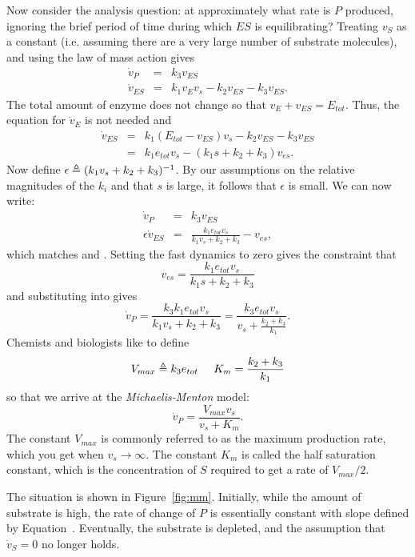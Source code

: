 Now consider the analysis question: at approximately what rate is $P$
produced, ignoring the brief period of time during which $ES$ is
equilibrating? Treating $v_S$ as a constant (i.e. assuming there are a
very large number of substrate molecules), and using the law of mass
action gives
\begin{eqnarray}
\dot v_{P}  & = & k_3 v_{ES} \\
\dot v_{ES} & = & k_1 v_E v_s - k_2 v_{ES} - k_3 v_{ES} .
\end{eqnarray}
The total amount of enzyme does not change so that $v_E + v_{ES} =
E_{tot}$. Thus, the equation for $\dot v_E$ is not needed and
%
\begin{eqnarray*}
\dot v_{ES} & = & k_1 (E_{tot}-v_{ES}) v_s - k_2 v_{ES} - k_3 v_{ES} \\
           & = & k_1 e_{tot} v_s - (k_1 s + k_2 + k_3 ) v_{es} .
\end{eqnarray*}
%
Now define $\epsilon \triangleq (k_1 v_s + k_2 + k_3)^{-1}$. By our assumptions
on the relative magnitudes of the $k_i$ and that $s$ is large, it
follows that $\epsilon$ is small. We can now write:
%
\begin{eqnarray}
\dot v_{P}  & = & k_3 v_{ES} \label{eqn:mm-sv1} \\
\epsilon \dot v_{ES} & = & \frac{k_1 e_{tot} v_s}{k_1 v_s + k_2 + k_3} - v_{es},  \label{eqn:mm-svp2}
\end{eqnarray}
%
which matches  and . Setting
the fast dynamics to zero gives the constraint that
%
$$
v_{es} = \frac{k_1 e_{tot} v_s}{k_1 s + k_2 + k_3}
$$
%
and substituting into  gives
%
$$
\dot v_{P} = \frac{k_3 k_1 e_{tot} v_s}{k_1 v_s + k_2 + k_3} = \frac{k_3 e_{tot} v_s}{v_s + \frac{k_2+k_3}{k_1}}.
$$
Chemists and biologists like to define
%
$$
V_{max} \triangleq k_3 e_{tot} \;\;\;\;\; K_m = \frac{k_2+k_3}{k_1}
$$
%
so that we arrive at the {\em Michaelis-Menton} model:
%
\begin{equation} \label{eqn:mm}
\dot v_{P} = \frac{V_{max} v_s}{v_s+K_m}.
\end{equation}
%
The constant $V_{max}$ is commonly referred to as the maximum
production rate, which you get when $v_s \rightarrow \infty$. The
constant $K_m$ is called the half saturation constant, which is the
concentration of $S$ required to get a rate of $V_{max}/2$. 

The situation is shown in Figure~\ref{fig:mm}. Initially, while the
amount of substrate is high, the rate of change of $P$ is essentially
constant with slope defined by Equation~. Eventually, the
substrate is depleted, and the assumption that $\dot v_S = 0$ no
longer holds.

